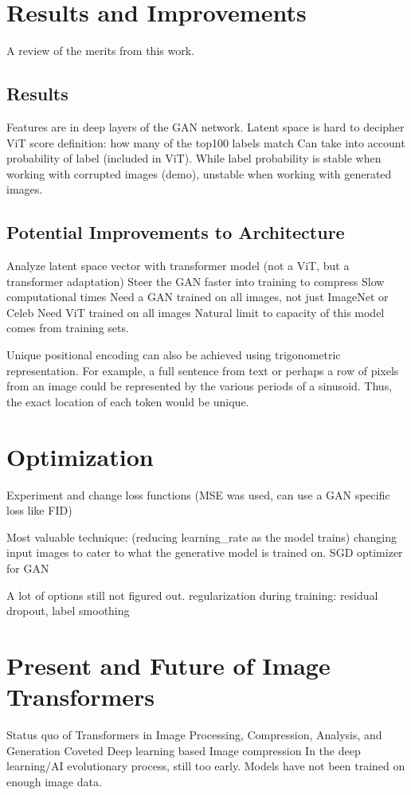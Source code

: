 \section{Results and Improvements}
A review of the merits from this work.

\subsection{Results}

Features are in deep layers of the GAN network. 
Latent space is hard to decipher
ViT score definition: how many of the top100 labels match
Can take into account probability of label (included in ViT).
While label probability is stable when working with corrupted images (demo), 
unstable when working with generated images.

\subsection{Potential Improvements to Architecture}

Analyze latent space vector with transformer model (not a ViT, but a transformer adaptation)
Steer the GAN faster into training to compress
Slow computational times
Need a GAN trained on all images, not just ImageNet or Celeb 
Need ViT trained on all images
Natural limit to capacity of this model comes from training sets.

Unique positional encoding can also be achieved using trigonometric representation.
For example, a full sentence from text or perhaps a row of pixels from an image could be represented by the various
periods of a sinusoid. Thus, the exact location of each token would be unique.

\section{Optimization}

Experiment and change loss functions (MSE was used, can use a GAN specific loss like FID)

Most valuable technique:
(reducing learning\_rate as the model trains)
changing input images to cater to what the generative model is trained on.
SGD optimizer for GAN

A lot of options still not figured out.
regularization during training: residual dropout, label smoothing


\section{Present and Future of Image Transformers}
Status quo of Transformers in Image Processing, Compression, Analysis, and Generation
Coveted Deep learning based Image compression 
In the deep learning/AI evolutionary process, still too early. Models have not been trained on enough image data.

